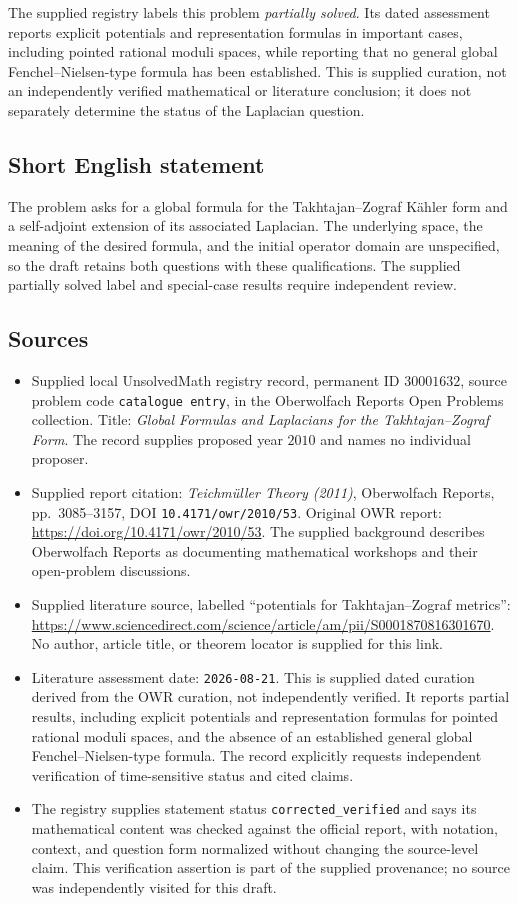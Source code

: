 \documentclass[11pt]{article}
\begin{document}
The supplied registry labels this problem \emph{partially solved}. Its dated assessment reports explicit potentials and representation formulas in important cases, including pointed rational moduli spaces, while reporting that no general global Fenchel--Nielsen-type formula has been established. This is supplied curation, not an independently verified mathematical or literature conclusion; it does not separately determine the status of the Laplacian question.
\subsection{Short English statement}
The problem asks for a global formula for the Takhtajan--Zograf Kähler form and a self-adjoint extension of its associated Laplacian. The underlying space, the meaning of the desired formula, and the initial operator domain are unspecified, so the draft retains both questions with these qualifications. The supplied partially solved label and special-case results require independent review.
\subsection{Sources}
\begin{itemize}
\item Supplied local UnsolvedMath registry record, permanent ID \(30001632\), source problem code \texttt{catalogue entry}, in the Oberwolfach Reports Open Problems collection. Title: \emph{Global Formulas and Laplacians for the Takhtajan--Zograf Form}. The record supplies proposed year \(2010\) and names no individual proposer.
\item Supplied report citation: \emph{Teichmüller Theory (2011)}, Oberwolfach Reports, pp.~3085--3157, DOI \texttt{10.4171/owr/2010/53}. Original OWR report: \url{https://doi.org/10.4171/owr/2010/53}. The supplied background describes Oberwolfach Reports as documenting mathematical workshops and their open-problem discussions.
\item Supplied literature source, labelled ``potentials for Takhtajan--Zograf metrics'': \url{https://www.sciencedirect.com/science/article/am/pii/S0001870816301670}. No author, article title, or theorem locator is supplied for this link.
\item Literature assessment date: \texttt{2026-08-21}. This is supplied dated curation derived from the OWR curation, not independently verified. It reports partial results, including explicit potentials and representation formulas for pointed rational moduli spaces, and the absence of an established general global Fenchel--Nielsen-type formula. The record explicitly requests independent verification of time-sensitive status and cited claims.
\item The registry supplies statement status \texttt{corrected\_verified} and says its mathematical content was checked against the official report, with notation, context, and question form normalized without changing the source-level claim. This verification assertion is part of the supplied provenance; no source was independently visited for this draft.
\end{itemize}
\end{document}
